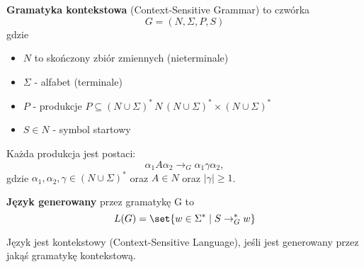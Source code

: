 \begin{definition}
\textbf{Gramatyka kontekstowa} (Context-Sensitive Grammar) to czwórka \[ G = (N, \Sigma, P, S) \] gdzie
\begin{itemize}
    \item \( N \) to skończony zbiór zmiennych (nieterminale)
    \item \( \Sigma \) - alfabet (terminale)
    \item \( P \) - produkcje \( P \subseteq  
    (N \cup \Sigma)^* \, N \, 
    (N \cup \Sigma)^* \times 
    (N \cup \Sigma)^* \)
    \item \( S \in N \) - symbol startowy
\end{itemize}
\end{definition}
Każda produkcja jest postaci:
\[
    \alpha_1 A \alpha_2 \rightarrow_G \alpha_1 \gamma \alpha_2,
\]
gdzie \( \alpha_1, \alpha_2, \gamma \in (N \cup \Sigma)^* \) oraz \( A \in N \) oraz \( |\gamma| \geq 1\).

\begin{definition}
    \textbf{Język  generowany} przez gramatykę G to 
    \[
        L(G) = \set{w \in \Sigma^* \mid S \rightarrow_G^* w}
    \]
\end{definition}

\begin{definition}
    Język jest kontekstowy (Context-Sensitive Language), jeśli jest generowany przez jakąś gramatykę kontekstową.
\end{definition}
